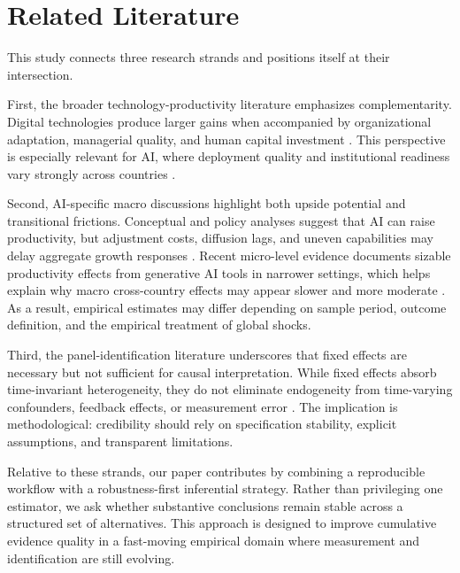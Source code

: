 \section{Related Literature}

This study connects three research strands and positions itself at their intersection.

First, the broader technology-productivity literature emphasizes complementarity. Digital technologies produce larger gains when accompanied by organizational adaptation, managerial quality, and human capital investment \cite{brynjolfssonHitt2000,griliches1998}. This perspective is especially relevant for AI, where deployment quality and institutional readiness vary strongly across countries \cite{bresnahanTrajtenberg1995,cominMestieri2018}.

Second, AI-specific macro discussions highlight both upside potential and transitional frictions. Conceptual and policy analyses suggest that AI can raise productivity, but adjustment costs, diffusion lags, and uneven capabilities may delay aggregate growth responses \cite{acemogluRestrepo2018,brynjolfssonRockSyverson2019,aghionJonesJones2017,korinekStiglitz2021,imf2024}. Recent micro-level evidence documents sizable productivity effects from generative AI tools in narrower settings, which helps explain why macro cross-country effects may appear slower and more moderate \cite{noyZhang2023,brynjolfssonLiRaymond2023,eloundouEtAl2023}. As a result, empirical estimates may differ depending on sample period, outcome definition, and the empirical treatment of global shocks.

Third, the panel-identification literature underscores that fixed effects are necessary but not sufficient for causal interpretation. While fixed effects absorb time-invariant heterogeneity, they do not eliminate endogeneity from time-varying confounders, feedback effects, or measurement error \cite{wooldridge2010,wooldridge2021,bai2009,callaway2021}. The implication is methodological: credibility should rely on specification stability, explicit assumptions, and transparent limitations.

Relative to these strands, our paper contributes by combining a reproducible workflow with a robustness-first inferential strategy. Rather than privileging one estimator, we ask whether substantive conclusions remain stable across a structured set of alternatives. This approach is designed to improve cumulative evidence quality in a fast-moving empirical domain where measurement and identification are still evolving.
